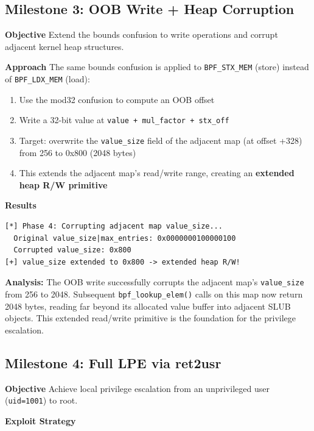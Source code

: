 \subsection{Milestone 3: OOB Write + Heap Corruption}

\textbf{Objective}
Extend the bounds confusion to write operations and corrupt adjacent kernel heap structures.

\textbf{Approach}
The same bounds confusion is applied to \texttt{BPF\_STX\_MEM} (store) instead of \texttt{BPF\_LDX\_MEM} (load):
\begin{enumerate}
    \item Use the mod32 confusion to compute an OOB offset
    \item Write a 32-bit value at \texttt{value + mul\_factor + stx\_off}
    \item Target: overwrite the \texttt{value\_size} field of the adjacent map (at offset +328) from 256 to 0x800 (2048 bytes)
    \item This extends the adjacent map's read/write range, creating an \textbf{extended heap R/W primitive}
\end{enumerate}

\textbf{Results}

\begin{lstlisting}[style=log,caption={Milestone 3: value\_size corruption}]
[*] Phase 4: Corrupting adjacent map value_size...
  Original value_size|max_entries: 0x0000000100000100
  Corrupted value_size: 0x800
[+] value_size extended to 0x800 -> extended heap R/W!
\end{lstlisting}

\textbf{Analysis:} The OOB write successfully corrupts the adjacent map's \texttt{value\_size} from 256 to 2048. Subsequent \texttt{bpf\_lookup\_elem()} calls on this map now return 2048 bytes, reading far beyond its allocated value buffer into adjacent SLUB objects. This extended read/write primitive is the foundation for the privilege escalation.


\subsection{Milestone 4: Full LPE via ret2usr}

\textbf{Objective}
Achieve local privilege escalation from an unprivileged user (\texttt{uid=1001}) to root.

\textbf{Exploit Strategy}

